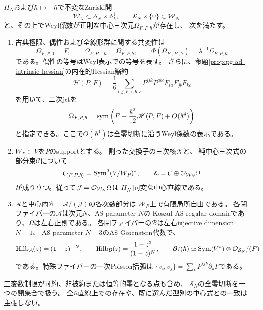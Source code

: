\begin{theorem}[全階数二係数空間上の同変中心元]
\label{thm:pg-intrinsic-rank-two-center}
$H_N$および$\hbar\mapsto-\hbar$で不変なZariski開
\begin{equation}
 \mathcal W_N\subset\mathcal S_N\times\mathbb A^1_\hbar,
 \qquad \mathcal S_N\times\{0\}\subset\mathcal W_N
 \label{eq:pg-intrinsic-rank-two-open}
\end{equation}
と、その上でWeyl係数が正則な中心三次元$\Omega_{F,P,\hbar}$が存在し、
次を満たす。
\begin{enumerate}
\item 古典極限、偶性および全線形群に関する共変性は
\begin{equation}
 \Omega_{F,P,0}=F,\qquad
 \Omega_{F,P,-\hbar}=\Omega_{F,P,\hbar},\qquad
 \Phi(\Omega_{F',P',\hbar})
       =\lambda^{-1}\Omega_{F,P,\hbar}
 \label{eq:pg-intrinsic-rank-two-covariance}
\end{equation}
である。偶性の等号はWeyl表示での等号を表す。
さらに、命題\ref{prop:pg-ad-intrinsic-hessian}の内在的Hessian縮約
\begin{equation}
 \mathscr H(P,F)=\frac16\sum_{i,j,k,a,b,c}
 P^{ijk}P^{abc}F_{ia}F_{jb}F_{kc}
 \label{eq:pg-intrinsic-prescribed-hessian}
\end{equation}
を用いて、二次jetを
\begin{equation}
 \Omega_{F,P,\hbar}
   =\operatorname{sym}\left(F-\frac{\hbar^2}{12}\mathscr H(P,F)+O(\hbar^4)\right)
 \label{eq:pg-intrinsic-prescribed-second-jet}
\end{equation}
と指定できる。ここで$O(\hbar^4)$は全零切断に沿うWeyl係数の表示である。
\item $W_P\subset V$を$P$のsupportとする。
割った交換子の三次核$\mathcal K$と、
純中心三次式の部分束$\mathcal C$について
\begin{equation}
 \mathcal C_{(F,P,\hbar)}
   =\operatorname{Sym}^3(V/W_P)^*,\qquad
 \mathcal K=\mathcal C\oplus\mathcal O_{\mathcal W_N}\Omega
 \label{eq:pg-intrinsic-rank-two-kernel-splitting}
\end{equation}
が成り立つ。従って$\mathcal J=\mathcal O_{\mathcal W_N}\Omega$は
$H_N$-同変な中心直線である。
\item $\mathcal A$と中心商$\mathcal B=\mathcal A/(\mathcal J)$の各次数部分は
$\mathcal W_N$上で有限局所自由である。
各閉ファイバーの$\mathcal A$は次元$N$、AS parameter $N$の
Koszul AS-regular domainであり、$\Omega$は左右正則である。
各閉ファイバーの$\mathcal B$は左右injective dimension $N-1$、
AS parameter $N-3$のAS-Gorenstein代数で、
\begin{equation}
 \operatorname{Hilb}_{\mathcal A}(z)=(1-z)^{-N},\qquad
 \operatorname{Hilb}_{\mathcal B}(z)=\frac{1-z^3}{(1-z)^N},\qquad
 \mathcal B/(\hbar)\simeq
 \operatorname{Sym}(V^*)\otimes\mathcal O_{\mathcal S_N}/(F)
 \label{eq:pg-intrinsic-rank-two-quotient}
\end{equation}
である。特殊ファイバーの一次Poisson括弧は
$\{v_i,v_j\}=\sum_kP^{ijk}\partial_kF$である。
\end{enumerate}
三変数制限が可約、非被約または恒等的零となる点も含め、
$\mathcal S_N$の全零切断を一つの開集合で扱う。
全$\hbar$直線上での存在や、既に選んだ型別の中心式との一致は主張しない。
\end{theorem}

